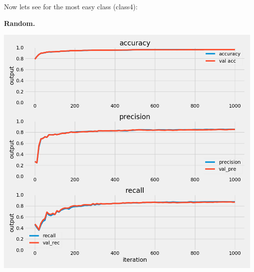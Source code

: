 \documentclass{article}
\begin{document}
Now lets see for the most easy class (class4):
\begin{multicols}{2}

	\begin{minipage}[t]{1\columnwidth}
	\begin{center}
	\textbf{Random.}\par\medskip
	\includegraphics[width=0.9\columnwidth]{../images/random_choice_class_4_cross_val_4.png}
	\label{random}
	\end{center}
	\end{minipage}


\end{multicols}
\end{document}
